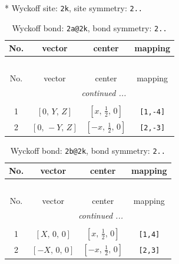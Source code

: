 \documentclass[fleqn,8pt]{jsarticle}
\begin{document}
* Wyckoff site: {\tt 2k}, site symmetry: {\tt 2..}
\renewcommand{\arraystretch}{1.2}
\begin{longtable}{cccc}
\caption{Wyckoff bond: {\tt 2a@2k}, bond symmetry: {\tt 2..}}
 \\
 \hline \hline
No. & vector & center & mapping \\ \hline \endfirsthead

\multicolumn{3}{l}{\tablename\ \thetable{}} \\
 \hline \hline
No. & vector & center & mapping \\ \hline \endhead

 \hline \hline
\multicolumn{3}{r}{\footnotesize\it continued ...} \\ \endfoot

 \hline \hline
\multicolumn{3}{r}{} \\ \endlastfoot

1 & $\left[ 0,\, Y,\, Z \right]$ & $\left[ x,\, \frac{1}{2},\, 0 \right]$ & {\tt [1,-4]} \\ \hline
2 & $\left[ 0,\, - Y,\, Z \right]$ & $\left[ - x,\, \frac{1}{2},\, 0 \right]$ & {\tt [2,-3]} \\
\end{longtable}
\renewcommand{\arraystretch}{1.2}
\begin{longtable}{cccc}
\caption{Wyckoff bond: {\tt 2b@2k}, bond symmetry: {\tt 2..}}
 \\
 \hline \hline
No. & vector & center & mapping \\ \hline \endfirsthead

\multicolumn{3}{l}{\tablename\ \thetable{}} \\
 \hline \hline
No. & vector & center & mapping \\ \hline \endhead

 \hline \hline
\multicolumn{3}{r}{\footnotesize\it continued ...} \\ \endfoot

 \hline \hline
\multicolumn{3}{r}{} \\ \endlastfoot

1 & $\left[ X,\, 0,\, 0 \right]$ & $\left[ x,\, \frac{1}{2},\, 0 \right]$ & {\tt [1,4]} \\ \hline
2 & $\left[ - X,\, 0,\, 0 \right]$ & $\left[ - x,\, \frac{1}{2},\, 0 \right]$ & {\tt [2,3]} \\
\end{longtable}
\renewcommand{\arraystretch}{1.2}
\end{document}
